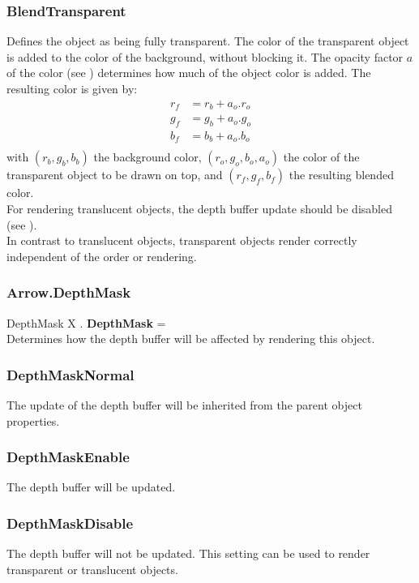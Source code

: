 \subsubsection{BlendTransparent \label{T:BlendType|BlendTransparent}}
Defines the object as being fully transparent. The color of the transparent object is added to the color of the background, without blocking it. The opacity factor $a$ of the color (see ) determines how much of the object color is added. The resulting color is given by:
\begin{equation}
\begin{array}{rcl}
r_f & = r_b + a_o . r_o \\
g_f & = g_b + a_o . g_o \\
b_f & = b_b + a_o . b_o \\
\end{array}
\end{equation}
with $(r_b,g_b,b_b)$ the background color, $(r_o,g_o,b_o,a_o)$ the color of the transparent object to be drawn on top, and $(r_f,g_f,b_f)$ the resulting blended color. \\
For rendering translucent objects, the depth buffer update should be disabled (see ). \\
In contrast to translucent objects, transparent objects render correctly independent of the order or rendering.

\subsubsection{Arrow.DepthMask \label{F:Arrow:DepthMask}}
DepthMask X . \textbf{DepthMask} = \\
Determines how the depth buffer will be affected by rendering this object.

\subsubsection{DepthMaskNormal \label{T:DepthMask|DepthMaskNormal}}
The update of the depth buffer will be inherited from the parent object properties.

\subsubsection{DepthMaskEnable \label{T:DepthMask|DepthMaskEnable}}
The depth buffer will be updated.

\subsubsection{DepthMaskDisable \label{T:DepthMask|DepthMaskDisable}}
The depth buffer will not be updated. This setting can be used to render transparent or translucent objects.

